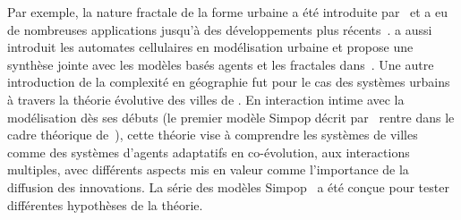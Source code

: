 {  Par exemple, la nature fractale de la forme urbaine a été introduite par~\cite{batty1994fractal} et a eu de nombreuses applications jusqu'à des développements plus récents~\cite{keersmaecker2003using}. %
 a aussi introduit les automates cellulaires en modélisation urbaine et propose une synthèse jointe avec les modèles basés agents et les fractales dans~\cite{batty2007cities}. 
Une autre introduction de la complexité en géographie fut pour le cas des systèmes urbains à travers la théorie évolutive des villes de . En interaction intime avec la modélisation dès ses débuts (le premier modèle Simpop décrit par~\cite{sanders1997simpop} rentre dans le cadre théorique de~\cite{pumain1997pour}), cette théorie vise à comprendre les systèmes de villes comme des systèmes d'agents adaptatifs en co-évolution, aux interactions multiples, avec différents aspects mis en valeur comme l'importance de la diffusion des innovations. La série des modèles Simpop~\cite{pumain2012multi} a été conçue pour tester différentes hypothèses de la théorie. 
}
